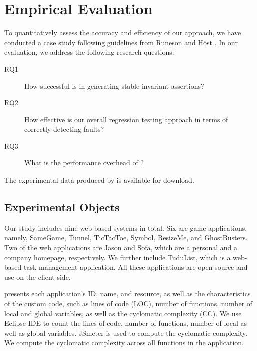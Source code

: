 \section{Empirical Evaluation}
\label{Sec:evaluation}
To quantitatively assess the accuracy and efficiency of our
approach, we have conducted a case study following guidelines
from Runeson and H{\"o}st \cite{runeson2009guidelines}. In our evaluation, we address the
following research questions:

\begin{description}
\item [RQ1] How successful is \jsart in generating stable invariant assertions?
\item [RQ2] How effective is our overall regression testing approach in terms of correctly detecting faults?
\item [RQ3] What is the performance overhead of \jsart?
\end{description} 

The experimental data produced by \jsart is available for download.


\subsection{Experimental Objects}
Our study includes nine web-based systems in total. Six
are game applications, namely, SameGame, Tunnel, TicTacToe,
Symbol, ResizeMe, and GhostBusters.
Two of the web applications are Jason and Sofa, which are a personal and a company homepage, respectively. We further include TuduList, which is a web-based task management application. All these applications are open source and use \javascript on the client-side. 

 presents each application's ID, name, and resource, as well as the characteristics of the custom \javascript code, such as \javascript lines of code (LOC), number of functions, number of local and global variables, as well as the cyclomatic complexity (CC).
We use Eclipse IDE to count the \javascript lines of code, number of functions, number of local as well as global variables. JSmeter  is used to compute the cyclomatic complexity.
We compute the cyclomatic complexity across all \javascript functions in the application.


